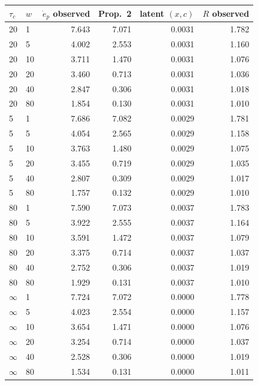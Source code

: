 \begin{tabular}{llrrrr}
\toprule
$\tau_c$ & $w$ & $\dot e_p$ observed & Prop.~2 & latent $(x,c)$ & $R$ observed\\
\midrule
20 & 1 & 7.643 & 7.071 & 0.0031 & 1.782\\
20 & 5 & 4.002 & 2.553 & 0.0031 & 1.160\\
20 & 10 & 3.711 & 1.470 & 0.0031 & 1.076\\
20 & 20 & 3.460 & 0.713 & 0.0031 & 1.036\\
20 & 40 & 2.847 & 0.306 & 0.0031 & 1.018\\
20 & 80 & 1.854 & 0.130 & 0.0031 & 1.010\\
5 & 1 & 7.686 & 7.082 & 0.0029 & 1.781\\
5 & 5 & 4.054 & 2.565 & 0.0029 & 1.158\\
5 & 10 & 3.763 & 1.480 & 0.0029 & 1.075\\
5 & 20 & 3.455 & 0.719 & 0.0029 & 1.035\\
5 & 40 & 2.807 & 0.309 & 0.0029 & 1.017\\
5 & 80 & 1.757 & 0.132 & 0.0029 & 1.010\\
80 & 1 & 7.590 & 7.073 & 0.0037 & 1.783\\
80 & 5 & 3.922 & 2.555 & 0.0037 & 1.164\\
80 & 10 & 3.591 & 1.472 & 0.0037 & 1.079\\
80 & 20 & 3.375 & 0.714 & 0.0037 & 1.037\\
80 & 40 & 2.752 & 0.306 & 0.0037 & 1.019\\
80 & 80 & 1.929 & 0.131 & 0.0037 & 1.010\\
$\infty$ & 1 & 7.724 & 7.072 & 0.0000 & 1.778\\
$\infty$ & 5 & 4.023 & 2.554 & 0.0000 & 1.157\\
$\infty$ & 10 & 3.654 & 1.471 & 0.0000 & 1.076\\
$\infty$ & 20 & 3.254 & 0.714 & 0.0000 & 1.037\\
$\infty$ & 40 & 2.528 & 0.306 & 0.0000 & 1.019\\
$\infty$ & 80 & 1.534 & 0.131 & 0.0000 & 1.011\\
\bottomrule
\end{tabular}
